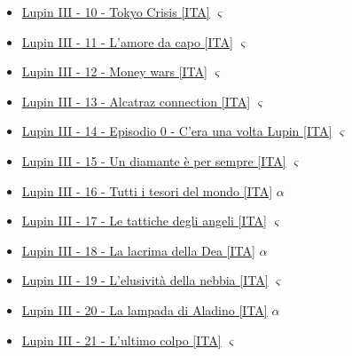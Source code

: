 \begin{itemize}
			    \item  \href{https://mega.nz/#!k6I0HCqL!IkkOYd83ymHhszcMp_t3J0uGyrNGkUJglccxLBw2xdo} {Lupin III - 10 - Tokyo Crisis [ITA]} $\varsigma$   \\ 
			    \item  \href{https://mega.nz/#!s7w0EASa!-5cwuSCplGMwA85juvam-8wuj6xavobdF8mZ9f5-0PI} {Lupin III - 11 - L'amore da capo [ITA]} $\varsigma$   \\ 
			    \item  \href{https://mega.nz/#!QvBmkQTT!jTw9oqBeWhBAN3W80lqEVN16t9-ZrDtzGXnDRNFh4eI} {Lupin III - 12 - Money wars [ITA]} $\varsigma$   \\ 
			    \item  \href{https://mega.nz/#!YyJXVL6B!EiLcH9xY6-cHyzPhvr4e2IjLucHPXrBO6jnKcLB-KAY} {Lupin III - 13 - Alcatraz connection  [ITA]} $\varsigma$   \\ 
			    \item  \href{https://mega.nz/#!NuAChLDK!1Q1I7wxIMpY5UCGFLjMueEa0QgNG7wfktzGQAyFgnMw} {Lupin III - 14 - Episodio 0 - C'era una volta Lupin [ITA]} $\varsigma$   \\ 
			    \item  \href{https://mega.nz/#!EqJCgCwQ!NHGaErnKmWTB0hxyWynSC4pnGufOrGISiTuJPPue9pI} {Lupin III - 15 - Un diamante è per sempre [ITA]} $\varsigma$   \\ 
		        \item  \href{https://mega.nz/#!MQMFTCRQ!GpKuRHFDsKMJa-Mgt4ECJVm-Ax9oQrzSBRLmF65Y5Wc} {Lupin III - 16 - Tutti i tesori del mondo [ITA]} $\alpha$  \\ 
		        \item  \href{https://mega.nz/#!lmpUXT7I!QQsCT3qr6zZimEw7z4JhUltGbZvk2DlcCz4L2WWJFEk} {Lupin III - 17 -  Le tattiche degli angeli [ITA]} $\varsigma$   \\ 
				\item  \href{https://mega.nz/#!McVC1YyT!eXfkVkMpis-jShXSu6BRV0v7628Gn3Z98Gvv_JmOLoc} {Lupin III - 18 - La lacrima della Dea [ITA]} $\alpha$  \\ 	
				\item  \href{https://mega.nz/#!R7RFUbTT!6QrLE43mmLtWPtdr1wVjeJmqVyBU3imKTk5rUiwgoGA} {Lupin III - 19 - L'elusività della nebbia [ITA]} $\varsigma$   \\  
				\item \href{https://mega.nz/#!V2hASYDQ!1NtzLoO_pGLX1V0eVraVdMfXA7vaObcCUqdSDUVxtQQ} {Lupin III - 20 - La lampada di Aladino [ITA]} $\alpha$  \\	
				\item  \href{https://mega.nz/#!8j4ylDjL!I8mhgMJ2FMAfidmhNOG1NTOrhLjHNnY7PWL8xZfP508} {Lupin III - 21 - L'ultimo colpo [ITA]} $\varsigma$   \\ 

\end{itemize}

